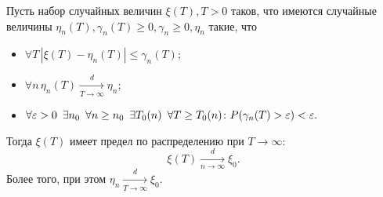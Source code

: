 \documentclass[12pt, a4paper, titlepage]{article}
\begin{document}
\begin{lem}\label{WeakConvergenceThirdLem} 
 Пусть набор случайных величин $\xi(T), T>0$ таков, что
 имеются случайные величины $\eta_n(T), \gamma_n(T)\ge 0, \gamma_n\ge 0, \eta_n$
 такие, что
\begin{itemize}
 \item $\forall T\, |\xi(T)-\eta_n(T)| \le \gamma_n(T)$;
 \item $\forall n \,\eta_n(T)\xrightarrow[T\to\infty]{d}\eta_n$;
 \item $\forall \varepsilon>0 \enskip \exists n_0 \enskip
\forall n \ge n_0 \enskip \exists T_0(n)\enskip \forall T \ge T_0(n) \colon
P(\gamma_n(T)>\varepsilon)<\varepsilon.$
\end{itemize}
Тогда $\xi(T)$ имеет предел по распределению при $T\to\infty$:
$$\xi(T)\xrightarrow[n \to \infty]{d}\xi_0.$$
Более того, при этом  $\eta_n\xrightarrow[T\to\infty]{d}\xi_0.$
\end{lem}
\end{document}
